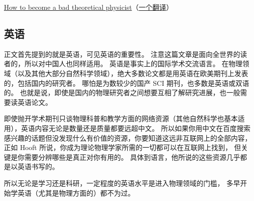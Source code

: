 \href{https://webspace.science.uu.nl/~hooft101/theoristbad.html#:~:text=On\%20your\%20way\%20towards\%20becoming,have\%20your\%20work\%20published\%20anyway.}{How to become a bad theoretical physicist}（\href{https://zhuanlan.zhihu.com/p/38680467}{一个翻译}）

\subsection{英语}
正文首先提到的就是英语，可见英语的重要性。 注意这篇文章是面向全世界的读者的，所以对中国人也同样适用。 英语是事实上的国际学术交流语言。 在物理领域（以及其他大部分自然科学领域），绝大多数论文都是用英语在欧美期刊上发表的，包括国内的研究者。 哪怕是为数较少的国产 SCI 期刊，也多数是英语或双语的。 也就是说，即使是国内的物理研究者之间想要互相了解研究进展，也一般需要读英语论文。

即使抛开学术期刊只谈物理科普和教学方面的网络资源（其他自然科学也基本适用），英语内容无论是数量还是质量都要远超中文。 所以如果你用中文在百度搜索感兴趣的话题但没发现什么有价值的资源，你要知道这远非互联网上的全部内容， 正如 Hooft 所说，你成为理论物理学家所需的一切都可以在互联网上找到， 但关键是你需要分辨哪些是真正对你有用的。 具体到语言，他所说的这些资源几乎都是以英语书写的。

所以无论是学习还是科研，一定程度的英语水平是进入物理领域的门槛， 多早开始学英语（尤其是物理方面的）都不为过。
